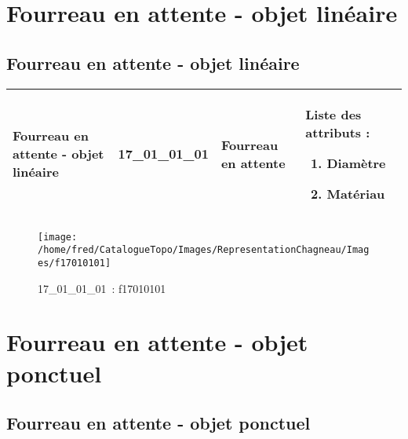 \documentclass[12pt,titlepage]{book}
\begin{document}
\section{\large Fourreau en attente - objet linéaire}
\subsection{Fourreau en attente - objet linéaire}
\noindent
\vspace{\baselineskip}

\renewcommand{\arraystretch}{1.2}
\begin{supertabular}{|p{10cm}|c|p{13cm}|p{12cm}|}
 Fourreau en attente - objet linéaire & 17\_01\_01\_01 & Fourreau en attente & Liste des attributs :
\begin{enumerate}
  \item Diamètre  \item Matériau\end{enumerate}
\\
\hline
\end{supertabular}
\begin{figure}[h!]
  \hfill         %
  \begin{minipage}[t]{3cm}
    \begin{center}
      \texttt{[image: /home/fred/CatalogueTopo/Images/RepresentationChagneau/Images/f17010101]}
      \caption[~17\_01\_01\_01]{\small{17\_01\_01\_01~:} \tiny{f17010101}}\label{f17010101}
    \end{center}
  \end{minipage}
\end{figure}

\section{\large Fourreau en attente - objet ponctuel}
\subsection{Fourreau en attente - objet ponctuel}
\noindent
\vspace{\baselineskip}
\end{document}
